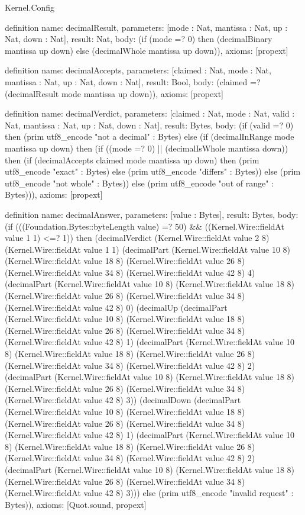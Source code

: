 \begin{lexlean}{Kernel.Config}
\begin{semanticmodule}
definition{
  name: decimalResult,
  parameters: [mode : Nat, mantissa : Nat, up : Nat, down : Nat],
  result: Nat,
  body: (if (mode =? 0) then (decimalBinary mantissa up down) else (decimalWhole mantissa up down)),
  axioms: [propext]
}

definition{
  name: decimalAccepts,
  parameters: [claimed : Nat, mode : Nat, mantissa : Nat, up : Nat, down : Nat],
  result: Bool,
  body: (claimed =? (decimalResult mode mantissa up down)),
  axioms: [propext]
}

definition{
  name: decimalVerdict,
  parameters: [claimed : Nat, mode : Nat, valid : Nat, mantissa : Nat, up : Nat, down : Nat],
  result: Bytes,
  body: (if (valid =? 0) then (prim utf8_encode "not a decimal" : Bytes) else (if (decimalInRange mode mantissa up down) then (if ((mode =? 0) || (decimalIsWhole mantissa down)) then (if (decimalAccepts claimed mode mantissa up down) then (prim utf8_encode "exact" : Bytes) else (prim utf8_encode "differs" : Bytes)) else (prim utf8_encode "not whole" : Bytes)) else (prim utf8_encode "out of range" : Bytes))),
  axioms: [propext]
}

definition{
  name: decimalAnswer,
  parameters: [value : Bytes],
  result: Bytes,
  body: (if (((Foundation.Bytes::byteLength value) =? 50) && ((Kernel.Wire::fieldAt value 1 1) <=? 1)) then (decimalVerdict (Kernel.Wire::fieldAt value 2 8) (Kernel.Wire::fieldAt value 1 1) (decimalPart (Kernel.Wire::fieldAt value 10 8) (Kernel.Wire::fieldAt value 18 8) (Kernel.Wire::fieldAt value 26 8) (Kernel.Wire::fieldAt value 34 8) (Kernel.Wire::fieldAt value 42 8) 4) (decimalPart (Kernel.Wire::fieldAt value 10 8) (Kernel.Wire::fieldAt value 18 8) (Kernel.Wire::fieldAt value 26 8) (Kernel.Wire::fieldAt value 34 8) (Kernel.Wire::fieldAt value 42 8) 0) (decimalUp (decimalPart (Kernel.Wire::fieldAt value 10 8) (Kernel.Wire::fieldAt value 18 8) (Kernel.Wire::fieldAt value 26 8) (Kernel.Wire::fieldAt value 34 8) (Kernel.Wire::fieldAt value 42 8) 1) (decimalPart (Kernel.Wire::fieldAt value 10 8) (Kernel.Wire::fieldAt value 18 8) (Kernel.Wire::fieldAt value 26 8) (Kernel.Wire::fieldAt value 34 8) (Kernel.Wire::fieldAt value 42 8) 2) (decimalPart (Kernel.Wire::fieldAt value 10 8) (Kernel.Wire::fieldAt value 18 8) (Kernel.Wire::fieldAt value 26 8) (Kernel.Wire::fieldAt value 34 8) (Kernel.Wire::fieldAt value 42 8) 3)) (decimalDown (decimalPart (Kernel.Wire::fieldAt value 10 8) (Kernel.Wire::fieldAt value 18 8) (Kernel.Wire::fieldAt value 26 8) (Kernel.Wire::fieldAt value 34 8) (Kernel.Wire::fieldAt value 42 8) 1) (decimalPart (Kernel.Wire::fieldAt value 10 8) (Kernel.Wire::fieldAt value 18 8) (Kernel.Wire::fieldAt value 26 8) (Kernel.Wire::fieldAt value 34 8) (Kernel.Wire::fieldAt value 42 8) 2) (decimalPart (Kernel.Wire::fieldAt value 10 8) (Kernel.Wire::fieldAt value 18 8) (Kernel.Wire::fieldAt value 26 8) (Kernel.Wire::fieldAt value 34 8) (Kernel.Wire::fieldAt value 42 8) 3))) else (prim utf8_encode "invalid request" : Bytes)),
  axioms: [Quot.sound, propext]
}
\end{semanticmodule}
\end{lexlean}
